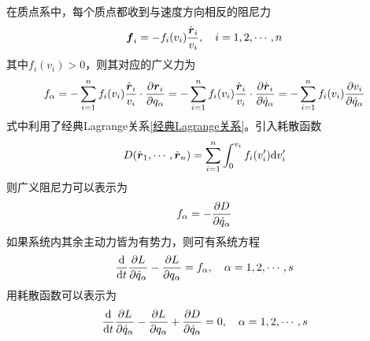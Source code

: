 在质点系中，每个质点都收到与速度方向相反的阻尼力
\begin{equation*}
	\boldsymbol{f}_i = -f_i(v_i) \frac{\dot{\boldsymbol{r}}_i}{v_i},\quad i=1,2,\cdots,n
\end{equation*}
其中$f_i(v_i)>0$，则其对应的广义力为
\begin{equation*}
	f_\alpha = -\sum_{i=1}^n f_i(v_i) \frac{\dot{\boldsymbol{r}}_i}{v_i} \cdot \frac{\partial \boldsymbol{r}_i}{\partial q_\alpha} = -\sum_{i=1}^n f_i(v_i) \frac{\dot{\boldsymbol{r}}_i}{v_i} \cdot \frac{\partial \dot{\boldsymbol{r}}_i}{\partial \dot{q}_\alpha} = -\sum_{i=1}^n f_i(v_i) \frac{\partial v_i}{\partial \dot{q}_\alpha}
\end{equation*}
式中利用了经典Lagrange关系\eqref{经典Lagrange关系}。引入{\heiti 耗散函数}
\begin{equation}
	D(\dot{\boldsymbol{r}}_1,\cdots,\dot{\boldsymbol{r}}_n) = \sum_{i=1}^n \int_0^{v_i} f_i(v'_i) \mathrm{d} v'_i
\end{equation}
则广义阻尼力可以表示为
\begin{equation*}
	f_\alpha = -\frac{\partial D}{\partial \dot{q}_\alpha}
\end{equation*}
如果系统内其余主动力皆为有势力，则可有系统方程
\begin{equation*}
	\frac{\mathrm{d}}{\mathrm{d} t} \frac{\partial L}{\partial \dot{q}_\alpha} - \frac{\partial L}{\partial q_\alpha} = f_\alpha,\quad \alpha = 1,2,\cdots,s
\end{equation*}
用耗散函数可以表示为
\begin{equation}
	\frac{\mathrm{d}}{\mathrm{d} t} \frac{\partial L}{\partial \dot{q}_\alpha} - \frac{\partial L}{\partial q_\alpha} + \frac{\partial D}{\partial \dot{q}_\alpha} = 0,\quad \alpha=1,2,\cdots,s
	\label{阻尼系统的Lagrange方程}
\end{equation}

